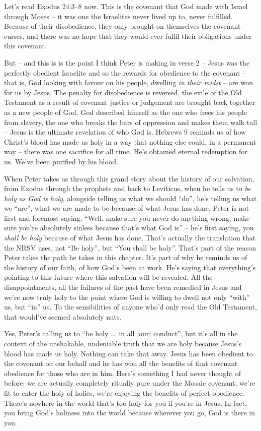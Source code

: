 Let's read Exodus 24:3--8 now. This is the covenant that God made with Israel
through Moses -- it was one the Israelites never lived up to, never fulfilled.
Because of their disobedience, they only brought on themselves the covenant
curses, and there was no hope that they would ever fulfil their obligations
under this covenant.

But -- and this is is the point I think Peter is making in verse 2 -- Jesus was
the perfectly obedient Israelite and so the rewards for obedience to the
covenant -- that is, God looking with favour on his people, dwelling \textit{in
their midst} -- are won for us by Jesus. The penalty for disobedience is
reversed, the exile of the Old Testament as a result of covenant justice or
judgement are brought back together as a new people of God. God described
himself as the one who frees his people from slavery, the one who breaks the
bars of oppression and makes them walk tall -- Jesus is the ultimate revelation
of who God is. Hebrews 9 reminds us of how Christ's blood has made us holy in a
way that nothing else could, in a permanent way -- there was one sacrifice for
all time. He's obtained eternal redemption for us. We've been purified by his
blood.

When Peter takes us through this grand story about the history of our salvation,
from Exodus through the prophets and back to Leviticus, when he tells us to
\textit{be holy as God is holy}, alongside telling us what we should
\enquote{do}, he's telling us what we \enquote{are}, what we are made to be
because of what Jesus has done. Peter is not first and foremost saying,
\enquote{Well, make sure you never do anything wrong; make sure you're
absolutely sinless because that's what God is} -- he's first saying, you
\textit{shall be holy} because of what Jesus has done. That's actually the
translation that the NRSV uses, not \enquote{Be holy}, but \enquote{You shall be
holy}. That's part of the reason Peter takes the path he takes in this chapter.
It's part of why he reminds us of the history of our faith, of how God's been at
work. He's saying that everything's pointing to this future where this salvation
will be revealed. All the disappointments, all the failures of the past have
been remedied in Jesus and we're now truly holy to the point where God is
willing to dwell not only \enquote{with} us, but \enquote{in} us. To the
sensibilities of anyone who'd only read the Old Testament, that would've seemed
absolutely nuts.

Yes, Peter's calling us to \enquote{be holy \dots\ in all [our] conduct}, but
it's all in the context of the unshakable, undeniable truth that we are holy
because Jesus's blood has made us holy. Nothing can take that away. Jesus has
been obedient to the covenant on our behalf and he has won all the benefits of
that covenant obedience for those who are in him. Here's something I had never
thought of before: we are actually completely ritually pure under the Mosaic
covenant, we're fit to enter the holy of holies, we're enjoying the benefits of
perfect obedience. There's nowhere in the world that's too holy for you if
you're in Jesus. In fact, you bring God's holiness into the world because
wherever you go, God is there in you.

